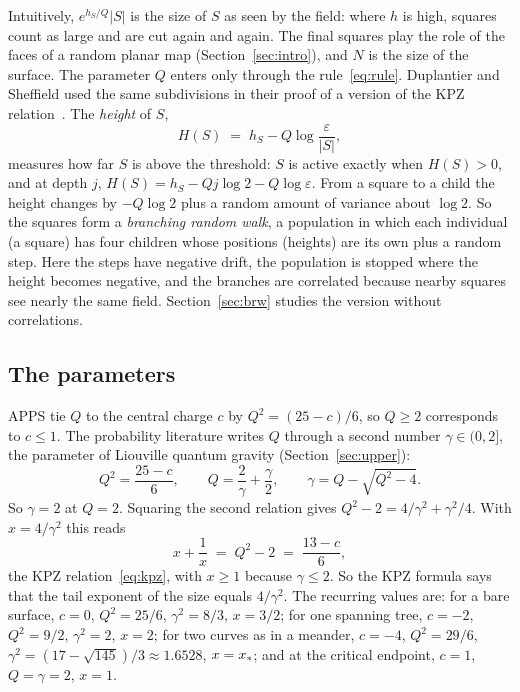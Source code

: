 Intuitively, $e^{h_S/Q}|S|$ is the size of $S$ as seen by the field: where $h$ is high, squares
count as large and are cut again and again. The final squares play the role of the faces of a
random planar map (Section~\ref{sec:intro}), and $N$ is the size of the surface. The parameter $Q$ enters only through the
rule~\eqref{eq:rule}. Duplantier and Sheffield used the same subdivisions in their proof of a
version of the KPZ relation~\cite{DS}. The \emph{height} of $S$,
\begin{equation}\label{eq:height}
H(S)\;=\;h_S-Q\log\frac{\varepsilon}{|S|},
\end{equation}
measures how far $S$ is above the threshold: $S$ is active exactly when $H(S)>0$, and at depth $j$,
$H(S)=h_S-Qj\log2-Q\log\varepsilon$. From a square to a child the height changes by $-Q\log2$ plus
a random amount of variance about $\log2$. So the squares form a \emph{branching random walk}, a
population in which each individual (a square) has four children whose positions (heights) are
its own plus a random step. Here the steps have negative drift, the population is stopped where
the height becomes negative, and the branches are correlated because nearby squares see nearly the
same field. Section~\ref{sec:brw} studies the version without correlations.

\subsection{The parameters}

APPS tie $Q$ to the central charge $c$ by $Q^2=(25-c)/6$, so $Q\ge2$ corresponds to $c\le1$. The
probability literature writes $Q$ through a second number $\gamma\in(0,2]$, the parameter of
Liouville quantum gravity (Section~\ref{sec:upper}):
\begin{equation}\label{eq:Q}
Q^2=\frac{25-c}{6},\qquad Q=\frac2\gamma+\frac\gamma2,\qquad \gamma=Q-\sqrt{Q^2-4}.
\end{equation}
So $\gamma=2$ at $Q=2$. Squaring the second relation gives
$Q^2-2=4/\gamma^2+\gamma^2/4$. With $x=4/\gamma^2$ this reads
\begin{equation}\label{eq:xQ}
x+\frac1x\;=\;Q^2-2\;=\;\frac{13-c}{6},
\end{equation}
the KPZ relation~\eqref{eq:kpz}, with $x\ge1$ because $\gamma\le2$. So the KPZ formula says that
the tail exponent of the size equals $4/\gamma^2$. The recurring values are: for a bare surface,
$c=0$, $Q^2=25/6$, $\gamma^2=8/3$, $x=3/2$; for one spanning tree, $c=-2$, $Q^2=9/2$, $\gamma^2=2$,
$x=2$; for two curves as in a meander, $c=-4$, $Q^2=29/6$, $\gamma^2=(17-\sqrt{145})/3\approx1.6528$,
$x=x_*$; and at the critical endpoint, $c=1$, $Q=\gamma=2$, $x=1$.

